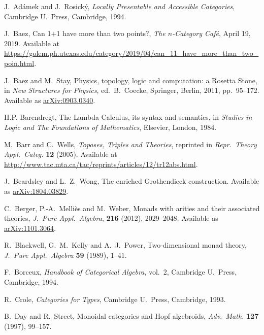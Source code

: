 \documentclass{amsart}
\theoremstyle{definition}
\begin{document}
\begin{thebibliography}{100}

 J.\ Ad\'{a}mek and J.\ Rosick\'{y}, \textsl{Locally Presentable and Accessible Categories}, Cambridge U.\ Press, Cambridge, 1994.

 J.\ Baez, Can 1+1 have more than two points?, \textsl{The $n$-Category Caf\'e}, April 19, 2019.   Available at \href{https://golem.ph.utexas.edu/category/2019/04/can_11_have_more_than_two_poin.html}{https://golem.ph.utexas.edu/category/2019/04/can\_11\_have\_more\_than\_two\_poin.html}.

 J.\ Baez and M.\ Stay, Physics, topology, logic and computation: a Rosetta Stone, in \textsl{New Structures for Physics}, ed.\ B.\ Coecke, Springer, Berlin, 2011, pp.\ 95--172.  Available as \href{https://arxiv.org/abs/0903.0340}{arXiv:0903.0340}.

 H.P. Barendregt, The Lambda Calculus, its syntax and semantics, in \textsl{Studies in Logic and The Foundations of Mathematics}, Elsevier, London, 1984.
	
 M.\ Barr and C.\ Wells, \textsl{Toposes, Triples and Theories}, reprinted in \textsl{Repr.\ Theory Appl.\ Categ.} \textbf{12} (2005).   Available at \href{http://www.tac.mta.ca/tac/reprints/articles/12/tr12abs.html}{http://www.tac.mta.ca/tac/reprints/articles/12/tr12abs.html}.

 J.\ Beardsley and L.\ Z.\ Wong, The enriched Grothendieck construction.  Available as \href{https://arxiv.org/abs/1804.03829}{arXiv:1804.03829}.
	
 C.\ Berger, P.-A.\ Melli\`es and M.\ Weber, Monads with arities and their associated theories, \textsl{J.\ Pure Appl.\ Algebra}, \textbf{216} (2012), 2029--2048.  Available as \href{https://arxiv.org/abs/1101.3064}{arXiv:1101.3064}.

 R.\ Blackwell, G.\ M.\ Kelly and A.\ J.\ Power, Two-dimensional monad theory, 
\textsl{J.\ Pure Appl.\ Algebra} \textbf{59} (1989), 1--41. 
 
 F.\ Borceux, \textsl{Handbook of Categorical Algebra}, vol.\ 2, Cambridge U.\ Press, Cambridge, 1994.

 R.\ Crole, \textsl{Categories for Types}, Cambridge U.\ Press, Cambridge, 1993.

 B.\ Day and R.\ Street, Monoidal categories and Hopf algebroids,
\textsl{Adv.\ Math.} \textbf{127} (1997), 99--157.


\end{thebibliography}
\end{document}
